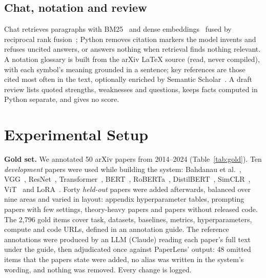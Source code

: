 \documentclass[conference]{IEEEtran}
\begin{document}
\subsection{Chat, notation and review}
Chat retrieves paragraphs with BM25~\cite{robertson2009bm25} and dense
embeddings~\cite{reimers2019sbert,karpukhin2020dpr} fused by reciprocal rank
fusion~\cite{cormack2009rrf}; Python removes citation markers the model invents and refuses
uncited answers, or answers nothing when retrieval finds nothing relevant. A notation
glossary is built from the arXiv LaTeX source (read, never compiled), with each symbol's
meaning grounded in a sentence; key references are those cited most often in the text,
optionally enriched by Semantic Scholar~\cite{valenzuela2015meaningful}. A draft review
lists quoted strengths, weaknesses and questions, keeps facts computed in Python separate,
and gives no score.

\section{Experimental Setup}

\textbf{Gold set.} We annotated 50 arXiv papers from 2014--2024 (Table~\ref{tab:gold}).
Ten \emph{development} papers were used while building the system: Bahdanau et
al.~\cite{bahdanau2015}, VGG~\cite{simonyan2015vgg}, ResNet~\cite{he2016resnet},
Transformer~\cite{vaswani2017attention}, BERT~\cite{devlin2019bert},
RoBERTa~\cite{liu2019roberta}, DistilBERT~\cite{sanh2019distilbert},
SimCLR~\cite{chen2020simclr}, ViT~\cite{dosovitskiy2021vit} and LoRA~\cite{hu2022lora}.
Forty \emph{held-out} papers were added afterwards, balanced over nine areas and varied in
layout: appendix hyperparameter tables, prompting papers with few settings, theory-heavy
papers and papers without released code. The 2{,}796 gold items cover task, datasets,
baselines, metrics, hyperparameters, compute and code URLs, defined in an annotation guide.
The reference annotations were produced by an LLM (Claude) reading each paper's full text
under the guide, then adjudicated once against PaperLens' output: 48 omitted items that the
papers state were added, no alias was written in the system's wording, and nothing was
removed. Every change is logged.
\end{document}
